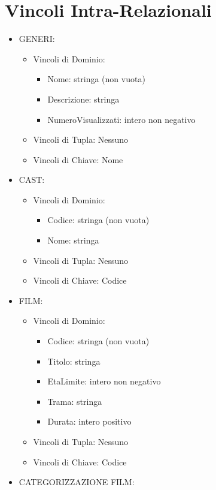 \documentclass[a4paper,12pt]{report}
\begin{document}
\section{Vincoli Intra-Relazionali}
\begin{itemize}
	\item GENERI:
	\begin{itemize}
		\item Vincoli di Dominio:
			\begin{itemize}
				\item Nome: stringa (non vuota)
				\item Descrizione: stringa
				\item NumeroVisualizzati: intero non negativo
			\end{itemize}
		\item Vincoli di Tupla: Nessuno
		\item Vincoli di Chiave: Nome
	\end{itemize}
	\item CAST:
	\begin{itemize}
		\item Vincoli di Dominio:
		\begin{itemize}
			\item Codice: stringa (non vuota)
			\item Nome: stringa
		\end{itemize}
		\item Vincoli di Tupla: Nessuno
		\item Vincoli di Chiave: Codice
	\end{itemize}
	\item FILM:
	\begin{itemize}
		\item Vincoli di Dominio:
		\begin{itemize}
			\item Codice: stringa (non vuota)
			\item Titolo: stringa
			\item EtaLimite: intero non negativo
			\item Trama: stringa
			\item Durata: intero positivo
		\end{itemize}
		\item Vincoli di Tupla: Nessuno
		\item Vincoli di Chiave: Codice
	\end{itemize}
	\item CATEGORIZZAZIONE FILM:
	\begin{itemize}

\end{itemize}
\end{itemize}
\end{document}
